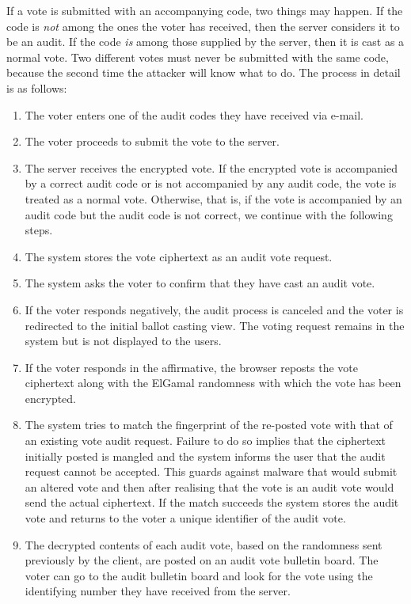 \documentclass[jets]{usenixjournal}
\begin{document}
If a vote is submitted with an accompanying code, two things may happen.
If the code is \emph{not} among the ones the voter has received, then
the server considers it to be an audit.
If the code \emph{is} among those supplied by the server,
then it is cast as a normal vote.
Two different votes must never be submitted with the same code, because
the second time the attacker will know what to do. The process in
detail is as follows:
\begin{enumerate}
\item The voter enters one of the audit codes they have received via e-mail.
\item The voter proceeds to submit the vote to the server.
\item The server receives the encrypted vote. If the encrypted vote is
  accompanied by a correct audit code or is not accompanied by any
  audit code, the vote is treated as a normal vote. Otherwise, that
  is, if the vote is accompanied by an audit code but the audit code
  is not correct, we continue with the following steps.
\item The system stores the vote ciphertext as an audit vote request.
\item The system asks the voter to confirm that they have cast an
  audit vote.
\item If the voter responds negatively, the audit process is
  canceled and the voter is redirected to the initial ballot casting
  view. The voting request remains in the system but is not displayed
  to the users.
\item If the voter responds in the affirmative, the browser reposts
  the vote ciphertext along with the ElGamal randomness with which the
  vote has been encrypted. 
\item The system tries to match the fingerprint of the re-posted vote
  with that of an existing vote audit request. Failure to do so
  implies that the ciphertext initially posted is mangled and the
  system informs the user that the audit request cannot be accepted.
  This guards against malware that would submit an altered vote and
  then after realising that the vote is an audit vote would send the
  actual ciphertext. If the match succeeds the system stores the audit
  vote and returns to the voter a unique identifier of the audit vote.
\item The decrypted contents of each audit vote, based on the
  randomness sent previously by the client, are posted on an audit
  vote bulletin board. The voter can go to the audit bulletin board
  and look for the vote using the identifying number they have
  received from the server.
\end{enumerate}
\end{document}
